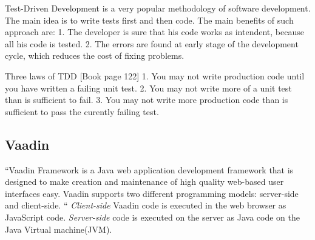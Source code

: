 \documentclass{article}
\begin{document}
		Test-Driven Development is a very popular methodology of software
			development. The main idea is to write tests first and then code. The main
			benefits of such approach are:
				1. The developer is sure that his code works as intendent, because all his
				code is tested.
				2. The errors are found at early stage of the development cycle, which
				reduces the cost of fixing problems.
			
			Three laws of TDD \cite[pp122]{Cleancode}[Book page 122]
				1. You may not write production code until you have written a failing unit
				test.
				2. You may not write more of a unit test than is sufficient to fail.
				3. You may not write more production code than is sufficient to pass the
				curently failing test.

	\subsection {Vaadin}	
	 ``Vaadin Framework is a Java web application development framework that is
	designed to make creation and maintenance of high quality web-based user interfaces easy.
	 Vaadin supports two different programming models: server-side and client-side. 
	 `` \cite[pr1.1]{bookVaaidn}
	 \emph{Client-side} Vaadin code is executed in the web browser as JavaScript
	 code.
	 \emph{Server-side} code is executed on the server as Java code on the Java
	 Virtual machine(JVM).
	 
\end{document}
